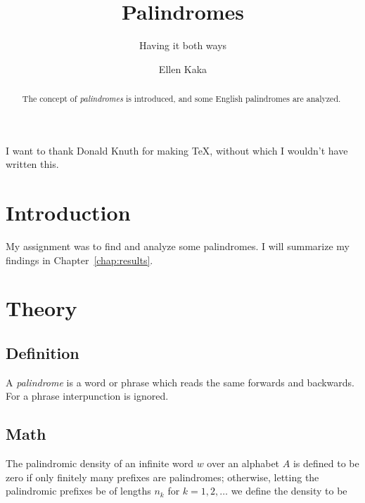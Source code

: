 \documentclass[thesis]{cluu}
\begin{document}
\author{Ellen Kaka}
\title{Palindromes}
\subtitle{Having it both ways}

\maketitle

\begin{abstract}
  The concept of \emph{palindromes} is introduced, and some English
  palindromes are analyzed.
\end{abstract}

\tableofcontents

I want to thank Donald Knuth for making \TeX, without which
I wouldn't have written this.


\chapter{Introduction}

My assignment was to find and analyze some palindromes.
I will summarize my findings in Chapter~\ref{chap:results}.

\chapter{Theory}

\section{Definition}

A \emph{palindrome} is a word or phrase which reads the same forwards and
backwards. For a phrase interpunction is ignored.

\section{Math}
The palindromic density of an infinite word \( w \) over an alphabet
\( A \) is defined to be zero if only finitely many prefixes are
palindromes; otherwise, letting the palindromic prefixes be of lengths
\( n_k \) for \( k=1,2,\dots \) we define the density to be  
\end{document}
